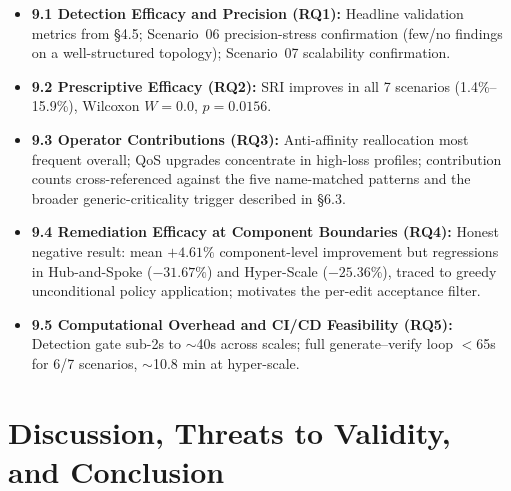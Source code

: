 \documentclass[11pt]{article}
\begin{document}
\begin{itemize}[leftmargin=*]
\item \textbf{9.1 Detection Efficacy and Precision (RQ1):} Headline validation metrics from \S4.5;
  Scenario~06 precision-stress confirmation (few/no findings on a well-structured topology);
  Scenario~07 scalability confirmation.
\item \textbf{9.2 Prescriptive Efficacy (RQ2):} SRI improves in all 7 scenarios (1.4\%--15.9\%),
  Wilcoxon $W=0.0$, $p=0.0156$.
\item \textbf{9.3 Operator Contributions (RQ3):} Anti-affinity reallocation most frequent overall;
  QoS upgrades concentrate in high-loss profiles; contribution counts cross-referenced against the
  five name-matched patterns and the broader generic-criticality trigger described in \S6.3.
\item \textbf{9.4 Remediation Efficacy at Component Boundaries (RQ4):} Honest negative result: mean
  $+4.61\%$ component-level improvement but regressions in Hub-and-Spoke ($-31.67\%$) and
  Hyper-Scale ($-25.36\%$), traced to greedy unconditional policy application; motivates the per-edit
  acceptance filter.
\item \textbf{9.5 Computational Overhead and CI/CD Feasibility (RQ5):} Detection gate sub-2s to
  $\sim$40s across scales; full generate--verify loop $<$65s for 6/7 scenarios, $\sim$10.8 min at
  hyper-scale.
\end{itemize}

\section{Discussion, Threats to Validity, and Conclusion}
\end{document}
